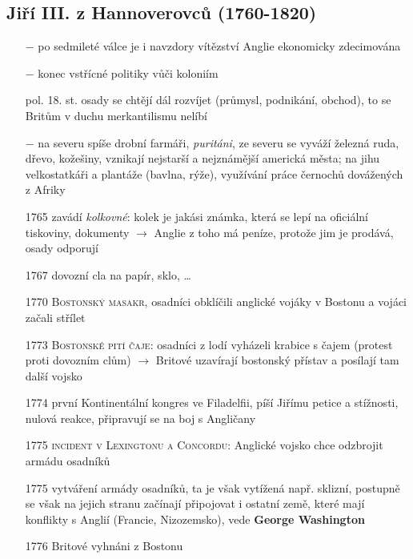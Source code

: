 \documentclass{article}
\begin{document}
\subsection*{Jiří III. z Hannoverovců (1760-1820)}
\begin{itemize}
    \vspace{-0.5em}
    \setlength\itemsep{0.15em}
    \item[$-$] po sedmileté válce je i navzdory vítězství Anglie ekonomicky zdecimována
    \item[$-$] konec vstřícné politiky vůči koloniím
    \item[pol. 18. st.] osady se chtějí dál rozvíjet (průmysl, podnikání, obchod), to se Britům v duchu merkantilismu nelíbí
    \item[$-$]  na severu spíše drobní farmáři, \textit{puritáni}, ze severu se vyváží železná ruda, dřevo, kožešiny, vznikají nejstarší a nejznámější americká města; na jihu velkostatkáři a plantáže (bavlna, rýže), využívání práce černochů dovážených z Afriky
    \item[1765] zavádí \textit{kolkovné}: kolek je jakási známka, která se lepí na oficiální tiskoviny, dokumenty $\rightarrow$ Anglie z toho má peníze, protože jim je prodává, osady odporují
    \item[1767] dovozní cla na papír, sklo, \dots
    \item[1770] \textsc{Bostonský masakr}, osadníci obklíčili anglické vojáky v Bostonu a vojáci začali střílet
    \item[1773] \textsc{Bostonské pití čaje}: osadníci z lodí vyházeli krabice s čajem (protest proti dovozním clům) $\rightarrow$ Britové uzavírají bostonský přístav a posílají tam další vojsko
    \item[1774] první Kontinentální kongres ve Filadelfii, píší Jiřímu petice a stížnosti, nulová reakce, připravují se na boj s Angličany
    \item[1775] \textsc{incident v Lexingtonu a Concordu}: Anglické vojsko chce odzbrojit armádu osadníků
    \item[1775] vytváření armády osadníků, ta je však vytížená např. sklizní, postupně se však na jejich stranu začínají připojovat i ostatní země, které mají konflikty s Anglií (Francie, Nizozemsko), vede \textbf{George Washington}
    \item[1776] Britové vyhnáni z Bostonu

  \end{itemize}
\end{document}
